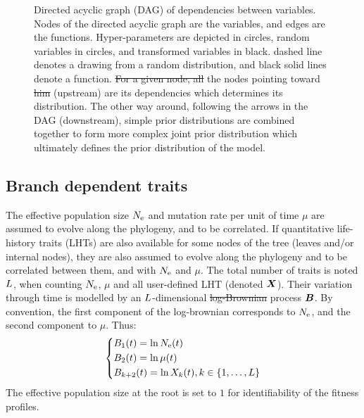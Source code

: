 \documentclass{article}
\providecommand{\DIFaddtex}[1]{{\protect\color{blue}\uwave{#1}}} %
\providecommand{\DIFdeltex}[1]{{\protect\color{red}\sout{#1}}}                      %
\providecommand{\DIFaddbegin}{} %
\providecommand{\DIFaddend}{} %
\providecommand{\DIFdelbegin}{} %
\providecommand{\DIFdelend}{} %
\providecommand{\DIFaddFL}[1]{\DIFadd{#1}} %
\providecommand{\DIFdelFL}[1]{\DIFdel{#1}} %
\providecommand{\DIFaddbeginFL}{} %
\providecommand{\DIFaddendFL}{} %
\providecommand{\DIFdelbeginFL}{} %
\providecommand{\DIFdelendFL}{} %
\providecommand{\DIFadd}[1]{\texorpdfstring{\DIFaddtex{#1}}{#1}} %
\providecommand{\DIFdel}[1]{\texorpdfstring{\DIFdeltex{#1}}{}} %
\begin{document}
\begin{figure}[t]
        \caption[Directed acyclic graph of dependencies between variables]{
            Directed acyclic graph (DAG) of dependencies between variables.
            Nodes of the directed acyclic graph are the variables, and edges are the functions.
            Hyper-parameters are depicted in {\color{RED}{red}} circles, random variables in {\color{BLUE}{blue}} circles, and transformed variables in black.
                {\color{BLUE}{Blue}} dashed line denotes a drawing from a random distribution, and black solid lines denote a function.
            \DIFdelbeginFL \DIFdelFL{For a given node, all }\DIFdelendFL \DIFaddbeginFL \DIFaddFL{All }\DIFaddendFL the nodes pointing toward \DIFdelbeginFL \DIFdelFL{him }\DIFdelendFL \DIFaddbeginFL \DIFaddFL{a given node }\DIFaddendFL (upstream) are its dependencies which determines its distribution.
            The other way around, following the arrows in the DAG (downstream), simple {prior} distributions are combined together to form more complex joint {prior} distribution which ultimately defines the {prior} distribution of the model.
        }\label{fig:DAG-MutSelNe}
    \end{figure}

    \subsection{Branch dependent traits}
    The {effective population size} $N_{\text{e}}$ and mutation rate per unit of time $\mu$ are assumed to evolve along the phylogeny, and to be correlated.
    If quantitative life-history traits ({LHT}s) are also available for some nodes of the tree (leaves and/or internal nodes), they are also assumed to evolve along the phylogeny and to be correlated between them, and with $N_{\text{e}}$ and $\mu$.
    The total number of traits is noted $L$, when counting $N_{\text{e}}$, $\mu$ and all user-defined LHT (denoted $\bm{X}$).
    Their variation through time is modelled by an $L$-dimensional \DIFdelbegin \DIFdel{log-Brownian }\DIFdelend \DIFaddbegin \DIFadd{geometric Brownian }\DIFaddend process $\bm{B}$.
    By convention, the first component of the log-brownian corresponds to $N_{\text{e}}$, and the second component to $\mu$.
    Thus:
    \begin{equation}
        \begin{dcases}
            B_1 (t) = \ln N_{\text{e}} (t) \\
            B_2 (t) = \ln \mu (t) \\
            B_{k+2}(t) = \ln X_k(t), k \in \{1, \hdots, L\}
        \end{dcases}
    \end{equation}
    The effective population size at the root is set to $1$ for identifiability of the fitness profiles.
\end{document}
